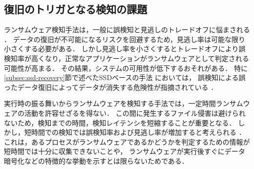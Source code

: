 
\subsection{復旧のトリガとなる検知の課題}
ランサムウェア検知手法は，一般に誤検知と見逃しのトレードオフに悩まされる \cite{Evolution-Ransomware,berrueta2019survey, mitigation-modern}．
データの復旧が不可能になるリスクを回避するため，見逃し率は可能な限り小さくする必要がある．
しかし見逃し率を小さくするとトレードオフにより誤検知率が高くなり，正常なアプリケーションがランサムウェアとして判定される可能性が高まる．
その結果，システムの可用性が低下するおそれがある．
特に\ref{subsec:ssd-recovery}節で述べたSSDベースの手法 \cite{huang2017flashguard,baek2018ssd} においては，
誤検知による誤ったデータ復旧によってデータが消失する危険性が指摘されている \cite{css2024-enomoto}．

実行時の振る舞いからランサムウェアを検知する手法では，一定時間ランサムウェアの活動を許容せざるを得ない．
この間に発生するファイル侵害は避けられないため，検知までの時間，検知レイテンシを短縮することが重要となる．
しかし，短時間での検知では誤検知率および見逃し率が増加すると考えられる \cite{mitigation-modern}．
これは，あるプロセスがランサムウェアであるかどうかを判定するための情報が短時間では十分に収集できないことや，
ランサムウェアが実行後すぐにデータ暗号化などの特徴的な挙動を示すとは限らないためである．
